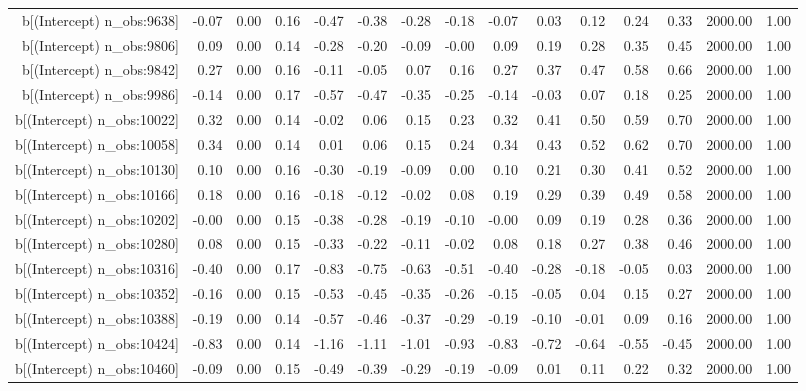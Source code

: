 \begin{table}[ht]
\begin{tabular}{rrrrrrrrrrrrrrr}
  b[(Intercept) n\_obs:9638] & -0.07 & 0.00 & 0.16 & -0.47 & -0.38 & -0.28 & -0.18 & -0.07 & 0.03 & 0.12 & 0.24 & 0.33 & 2000.00 & 1.00 \\ 
  b[(Intercept) n\_obs:9806] & 0.09 & 0.00 & 0.14 & -0.28 & -0.20 & -0.09 & -0.00 & 0.09 & 0.19 & 0.28 & 0.35 & 0.45 & 2000.00 & 1.00 \\ 
  b[(Intercept) n\_obs:9842] & 0.27 & 0.00 & 0.16 & -0.11 & -0.05 & 0.07 & 0.16 & 0.27 & 0.37 & 0.47 & 0.58 & 0.66 & 2000.00 & 1.00 \\ 
  b[(Intercept) n\_obs:9986] & -0.14 & 0.00 & 0.17 & -0.57 & -0.47 & -0.35 & -0.25 & -0.14 & -0.03 & 0.07 & 0.18 & 0.25 & 2000.00 & 1.00 \\ 
  b[(Intercept) n\_obs:10022] & 0.32 & 0.00 & 0.14 & -0.02 & 0.06 & 0.15 & 0.23 & 0.32 & 0.41 & 0.50 & 0.59 & 0.70 & 2000.00 & 1.00 \\ 
  b[(Intercept) n\_obs:10058] & 0.34 & 0.00 & 0.14 & 0.01 & 0.06 & 0.15 & 0.24 & 0.34 & 0.43 & 0.52 & 0.62 & 0.70 & 2000.00 & 1.00 \\ 
  b[(Intercept) n\_obs:10130] & 0.10 & 0.00 & 0.16 & -0.30 & -0.19 & -0.09 & 0.00 & 0.10 & 0.21 & 0.30 & 0.41 & 0.52 & 2000.00 & 1.00 \\ 
  b[(Intercept) n\_obs:10166] & 0.18 & 0.00 & 0.16 & -0.18 & -0.12 & -0.02 & 0.08 & 0.19 & 0.29 & 0.39 & 0.49 & 0.58 & 2000.00 & 1.00 \\ 
  b[(Intercept) n\_obs:10202] & -0.00 & 0.00 & 0.15 & -0.38 & -0.28 & -0.19 & -0.10 & -0.00 & 0.09 & 0.19 & 0.28 & 0.36 & 2000.00 & 1.00 \\ 
  b[(Intercept) n\_obs:10280] & 0.08 & 0.00 & 0.15 & -0.33 & -0.22 & -0.11 & -0.02 & 0.08 & 0.18 & 0.27 & 0.38 & 0.46 & 2000.00 & 1.00 \\ 
  b[(Intercept) n\_obs:10316] & -0.40 & 0.00 & 0.17 & -0.83 & -0.75 & -0.63 & -0.51 & -0.40 & -0.28 & -0.18 & -0.05 & 0.03 & 2000.00 & 1.00 \\ 
  b[(Intercept) n\_obs:10352] & -0.16 & 0.00 & 0.15 & -0.53 & -0.45 & -0.35 & -0.26 & -0.15 & -0.05 & 0.04 & 0.15 & 0.27 & 2000.00 & 1.00 \\ 
  b[(Intercept) n\_obs:10388] & -0.19 & 0.00 & 0.14 & -0.57 & -0.46 & -0.37 & -0.29 & -0.19 & -0.10 & -0.01 & 0.09 & 0.16 & 2000.00 & 1.00 \\ 
  b[(Intercept) n\_obs:10424] & -0.83 & 0.00 & 0.14 & -1.16 & -1.11 & -1.01 & -0.93 & -0.83 & -0.72 & -0.64 & -0.55 & -0.45 & 2000.00 & 1.00 \\ 
  b[(Intercept) n\_obs:10460] & -0.09 & 0.00 & 0.15 & -0.49 & -0.39 & -0.29 & -0.19 & -0.09 & 0.01 & 0.11 & 0.22 & 0.32 & 2000.00 & 1.00 \\ 

\end{tabular}
\end{table}
